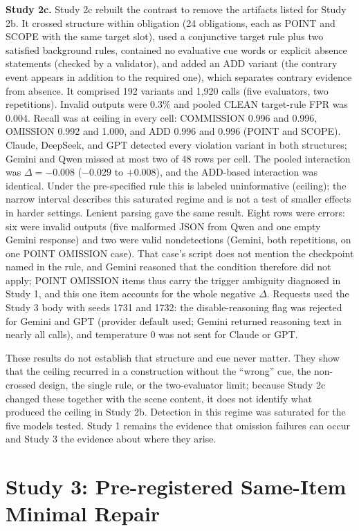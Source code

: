 \documentclass{ieeeaccess}
\begin{document}
\textbf{Study 2c.} Study 2c rebuilt the contrast to remove the artifacts listed for Study 2b. It crossed structure within obligation (24 obligations, each as POINT and SCOPE with the same target slot), used a conjunctive target rule plus two satisfied background rules, contained no evaluative cue words or explicit absence statements (checked by a validator), and added an ADD variant (the contrary event appears in addition to the required one), which separates contrary evidence from absence. It comprised 192 variants and 1,920 calls (five evaluators, two repetitions). Invalid outputs were 0.3\% and pooled CLEAN target-rule FPR was 0.004. Recall was at ceiling in every cell: COMMISSION 0.996 and 0.996, OMISSION 0.992 and 1.000, and ADD 0.996 and 0.996 (POINT and SCOPE). Claude, DeepSeek, and GPT detected every violation variant in both structures; Gemini and Qwen missed at most two of 48 rows per cell. The pooled interaction was $\Delta=-0.008$ ($-0.029$ to $+0.008$), and the ADD-based interaction was identical. Under the pre-specified rule this is labeled uninformative (ceiling); the narrow interval describes this saturated regime and is not a test of smaller effects in harder settings. Lenient parsing gave the same result. Eight rows were errors: six were invalid outputs (five malformed JSON from Qwen and one empty Gemini response) and two were valid nondetections (Gemini, both repetitions, on one POINT OMISSION case). That case's script does not mention the checkpoint named in the rule, and Gemini reasoned that the condition therefore did not apply; POINT OMISSION items thus carry the trigger ambiguity diagnosed in Study 1, and this one item accounts for the whole negative $\Delta$. Requests used the Study 3 body with seeds 1731 and 1732: the disable-reasoning flag was rejected for Gemini and GPT (provider default used; Gemini returned reasoning text in nearly all calls), and temperature 0 was not sent for Claude or GPT.

These results do not establish that structure and cue never matter. They show that the ceiling recurred in a construction without the ``wrong'' cue, the non-crossed design, the single rule, or the two-evaluator limit; because Study 2c changed these together with the scene content, it does not identify what produced the ceiling in Study 2b. Detection in this regime was saturated for the five models tested. Study 1 remains the evidence that omission failures can occur and Study 3 the evidence about where they arise.

\section{Study 3: Pre-registered Same-Item Minimal Repair}
\label{sec:study3}
\end{document}
